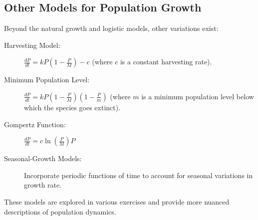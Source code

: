 \documentclass{article}
\begin{document}
\subsection*{Other Models for Population Growth}
Beyond the natural growth and logistic models, other variations exist:
\begin{description}
    \item[Harvesting Model:] $\frac{dP}{dt} = kP\left(1 - \frac{P}{M}\right) - c$ (where $c$ is a constant harvesting rate).
    \item[Minimum Population Level:] $\frac{dP}{dt} = kP\left(1 - \frac{P}{M}\right)\left(1 - \frac{P}{m}\right)$ (where $m$ is a minimum population level below which the species goes extinct).
    \item[Gompertz Function:] $\frac{dP}{dt} = c \ln\left(\frac{P}{M}\right) P$
    \item[Seasonal-Growth Models:] Incorporate periodic functions of time to account for seasonal variations in growth rate.
\end{description}
These models are explored in various exercises and provide more nuanced descriptions of population dynamics.
\end{document}

